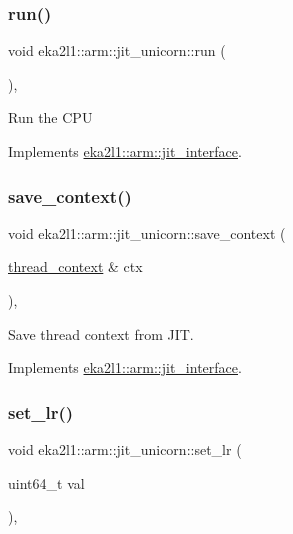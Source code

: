 \subsubsection{\texorpdfstring{run()}{run()}}
{\footnotesize\ttfamily void eka2l1\+::arm\+::jit\+\_\+unicorn\+::run (\begin{DoxyParamCaption}{ }\end{DoxyParamCaption})\hspace{0.3cm}{\ttfamily [override]}, {\ttfamily [virtual]}}

Run the C\+PU 

Implements \mbox{\hyperlink{classeka2l1_1_1arm_1_1jit__interface_a30ede595d2381735d13642768dda3be8}{eka2l1\+::arm\+::jit\+\_\+interface}}.

\mbox{\label{classeka2l1_1_1arm_1_1jit__unicorn_a315e75d56daf439ca9914fcf44de5dcf}} 
\subsubsection{\texorpdfstring{save\+\_\+context()}{save\_context()}}
{\footnotesize\ttfamily void eka2l1\+::arm\+::jit\+\_\+unicorn\+::save\+\_\+context (\begin{DoxyParamCaption}\item[{\mbox{\hyperlink{structeka2l1_1_1arm_1_1jit__interface_1_1thread__context}{thread\+\_\+context}} \&}]{ctx }\end{DoxyParamCaption})\hspace{0.3cm}{\ttfamily [override]}, {\ttfamily [virtual]}}

Save thread context from J\+IT. 

Implements \mbox{\hyperlink{classeka2l1_1_1arm_1_1jit__interface_ad45558cfaff99f21a89734676b13cb9a}{eka2l1\+::arm\+::jit\+\_\+interface}}.

\mbox{\label{classeka2l1_1_1arm_1_1jit__unicorn_a73a5362b1004f6c7bcaa4f2580fefb2c}} 
\subsubsection{\texorpdfstring{set\+\_\+lr()}{set\_lr()}}
{\footnotesize\ttfamily void eka2l1\+::arm\+::jit\+\_\+unicorn\+::set\+\_\+lr (\begin{DoxyParamCaption}\item[{uint64\+\_\+t}]{val }\end{DoxyParamCaption})\hspace{0.3cm}{\ttfamily [override]}, {\ttfamily [virtual]}}

